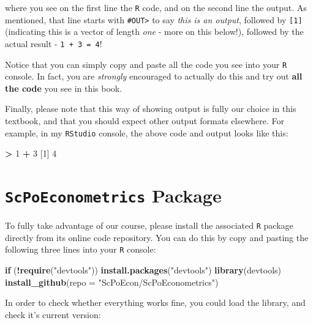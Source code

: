 \documentclass[]{book}
\newenvironment{Shaded}{\begin{snugshade}}{\end{snugshade}}
\newcommand{\ControlFlowTok}[1]{\textcolor[rgb]{0.13,0.29,0.53}{\textbf{#1}}}
\newcommand{\DataTypeTok}[1]{\textcolor[rgb]{0.13,0.29,0.53}{#1}}
\newcommand{\DecValTok}[1]{\textcolor[rgb]{0.00,0.00,0.81}{#1}}
\newcommand{\KeywordTok}[1]{\textcolor[rgb]{0.13,0.29,0.53}{\textbf{#1}}}
\newcommand{\NormalTok}[1]{#1}
\newcommand{\OperatorTok}[1]{\textcolor[rgb]{0.81,0.36,0.00}{\textbf{#1}}}
\newcommand{\StringTok}[1]{\textcolor[rgb]{0.31,0.60,0.02}{#1}}
\begin{document}
where you see on the first line the \texttt{R} code, and on the second line the output. As mentioned, that line starts with \texttt{\#OUT\textgreater{}} to say \emph{this is an output}, followed by \texttt{{[}1{]}} (indicating this is a vector of length \emph{one} - more on this below!), followed by the actual result - \texttt{1\ +\ 3\ =\ 4}!

Notice that you can simply copy and paste all the code you see into your \texttt{R} console. In fact, you are \emph{strongly} encouraged to actually do this and try out \textbf{all the code} you see in this book.

Finally, please note that this way of showing output is fully our choice in this textbook, and that you should expect other output formats elsewhere. For example, in my \texttt{RStudio} console, the above code and output looks like this:

\begin{Shaded}
\begin{Highlighting}[]
\OperatorTok{>}\StringTok{ }\DecValTok{1} \OperatorTok{+}\StringTok{ }\DecValTok{3}
\NormalTok{[}\DecValTok{1}\NormalTok{] }\DecValTok{4}
\end{Highlighting}
\end{Shaded}

\hypertarget{install-package}{%
\section{\texorpdfstring{\texttt{ScPoEconometrics} Package}{ScPoEconometrics Package}}\label{install-package}}

To fully take advantage of our course, please install the associated \texttt{R} package directly from its online code repository. You can do this by copy and pasting the following three lines into your \texttt{R} console:

\begin{Shaded}
\begin{Highlighting}[]
\ControlFlowTok{if}\NormalTok{ (}\OperatorTok{!}\KeywordTok{require}\NormalTok{(}\StringTok{"devtools"}\NormalTok{)) }\KeywordTok{install.packages}\NormalTok{(}\StringTok{"devtools"}\NormalTok{)}
\KeywordTok{library}\NormalTok{(devtools)}
\KeywordTok{install_github}\NormalTok{(}\DataTypeTok{repo =} \StringTok{"ScPoEcon/ScPoEconometrics"}\NormalTok{)}
\end{Highlighting}
\end{Shaded}

In order to check whether everything works fine, you could load the library, and check it's current version:
\end{document}
